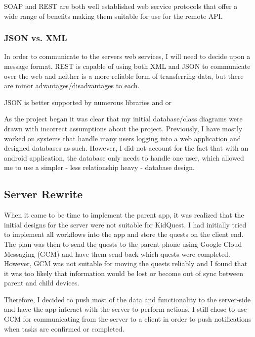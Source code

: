 SOAP and REST are both well established web service protocols that offer a wide range of benefits making them suitable for use for the remote API.


\subsubsection{JSON vs. XML}
In order to communicate to the servers web services, I will need to decide upon a message format. 
REST is capable of using both XML and JSON to communicate over the web and neither is a more reliable form of transferring data, but there are minor advantages/disadvantages to each.

JSON is better supported by numerous libraries and or






As the project began it was clear that my initial database/class diagrams were drawn with incorrect assumptions about the project. 
Previously, I have mostly worked on systems that handle many users logging into a web application and designed databases as such. 
However, I did not account for the fact that with an android application, the database only needs to handle one user, which allowed me to use a simpler - less relationship heavy - database design.

\subsection{Server Rewrite}
When it came to be time to implement the parent app, it was realized that the initial designs for the server were not suitable for KidQuest.
I had initially tried to implement all workflows into the app and store the quests on the client end. 
The plan was then to send the quests to the parent phone using Google Cloud Messaging (GCM) and have them send back which quests were completed.
However, GCM was not suitable for moving the quests reliably and I found that it was too likely that information would be lost or become out of sync between parent and child devices.

Therefore, I decided to push most of the data and functionality to the server-side and have the app interact with the server to perform actions.
I still chose to use GCM for communicating from the server to a client in order to push notifications when tasks are confirmed or completed.

